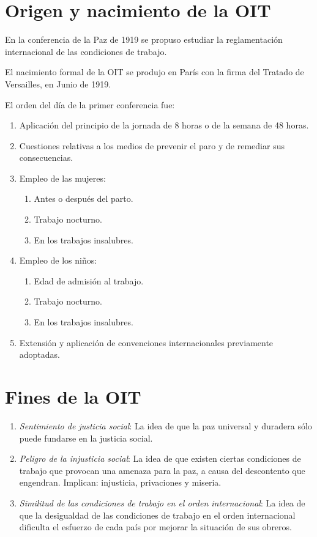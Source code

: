 \documentclass[spanish,12pt,a4paper,titlepage]{report}
\begin{document}
\section{Origen y nacimiento de la OIT}
\label{sec:origen-y-nacimiento-de-la-oit}

En la conferencia de la Paz de 1919 se propuso estudiar la reglamentación internacional de las condiciones de trabajo.

El nacimiento formal de la OIT se produjo en París con la firma del Tratado de Versailles, en Junio de 1919.

El orden del día de la primer conferencia fue:

\begin{enumerate}
\item Aplicación del principio de la jornada de 8 horas o de la semana de 48 horas.
\item Cuestiones relativas a los medios de prevenir el paro y de remediar sus consecuencias.
\item Empleo de las mujeres:
  \begin{enumerate}
  \item Antes o después del parto.
  \item Trabajo nocturno.
  \item En los trabajos insalubres.
  \end{enumerate}
\item Empleo de los niños:
  \begin{enumerate}
  \item Edad de admisión al trabajo.
  \item Trabajo nocturno.
  \item En los trabajos insalubres.
  \end{enumerate}
\item Extensión y aplicación de convenciones internacionales previamente adoptadas.
\end{enumerate}

\section{Fines de la OIT}
\label{sec:fines-de-la-oit}

\begin{enumerate}
\item \textit{Sentimiento de justicia social}: La idea de que la paz universal y duradera sólo puede fundarse en la justicia social.
\item \textit{Peligro de la injusticia social}: La idea de que existen ciertas condiciones de trabajo que provocan una amenaza para la paz, a causa del descontento que engendran. Implican: injusticia, privaciones y miseria.
\item \textit{Similitud de las condiciones de trabajo en el orden internacional}: La idea de que la desigualdad de las condiciones de trabajo en el orden internacional dificulta el esfuerzo de cada país por mejorar la situación de sus obreros. 
\end{enumerate}
\end{document}
